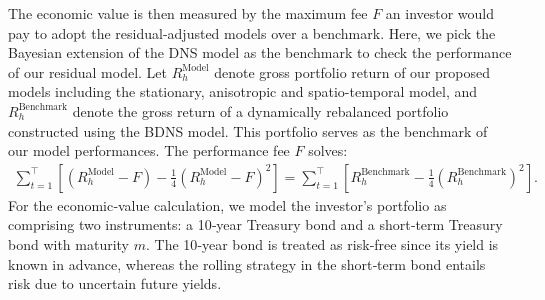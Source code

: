 \documentclass[
  12pt]{article}
\begin{document}
The economic value is then measured by the maximum fee $F$ an investor would pay to adopt the residual-adjusted models over a benchmark. Here, we pick the Bayesian extension of the DNS model as the benchmark to check the performance of our residual model. Let $R_{h}^{\text{Model}}$ denote gross portfolio return of our proposed models including the stationary, anisotropic and spatio-temporal model, and $R_{h}^{\text{Benchmark}}$ denote the gross return of a dynamically rebalanced portfolio constructed using the BDNS model. This portfolio serves as the benchmark of our model performances. The performance fee $F$ solves:
\begin{align*}
    \sum_{t=1}^\top \left[ \left(R_{h}^{\text{Model}} - F\right) -\frac{1}{4} \left(R_{h}^{\text{Model}} - F\right)^2 \right] =
    \sum_{t=1}^\top \left[ R_{h}^{\text{Benchmark}} -\frac{1}{4} \left(R_{h}^{\text{Benchmark}}\right)^2 \right].
\end{align*}
For the economic‐value calculation, we model the investor’s portfolio as comprising two instruments: a 10‑year Treasury bond and a short‑term Treasury bond with maturity $m$.  The 10‑year bond is treated as risk‐free since its yield is known in advance, whereas the rolling strategy in the short‑term bond entails risk due to uncertain future yields.
\end{document}
